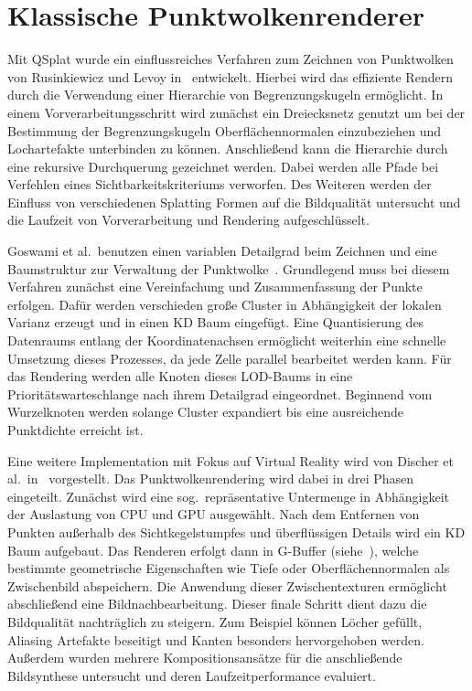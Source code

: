 \documentclass[hyperref, beleg, german, final, twoside]{cgvpub}
\begin{document}
\section{Klassische Punktwolkenrenderer}

Mit QSplat wurde ein einflussreiches Verfahren zum Zeichnen von Punktwolken von
Rusinkiewicz und Levoy in~\cite{rusinkiewicz2000qsplat} entwickelt. Hierbei
wird das effiziente Rendern durch die Verwendung einer Hierarchie von
Begrenzungskugeln ermöglicht. In einem Vorverarbeitungsschritt wird zunächst
ein Dreiecksnetz genutzt um bei der Bestimmung der Begrenzungskugeln
Oberflächennormalen einzubeziehen und Lochartefakte unterbinden zu können.
Anschließend kann die Hierarchie durch eine rekursive Durchquerung gezeichnet
werden. Dabei werden alle Pfade bei Verfehlen eines Sichtbarkeitskriteriums
verworfen. Des Weiteren werden der Einfluss von verschiedenen Splatting Formen
auf die Bildqualität untersucht und die Laufzeit von Vorverarbeitung und
Rendering aufgeschlüsselt.

Goswami et al.\ benutzen einen variablen Detailgrad beim Zeichnen und eine
Baumstruktur zur Verwaltung der Punktwolke~\cite{goswami2010high}. Grundlegend
muss bei diesem Verfahren zunächst eine Vereinfachung und Zusammenfassung der
Punkte erfolgen. Dafür werden verschieden große Cluster in Abhängigkeit der
lokalen Varianz erzeugt und in einen KD Baum eingefügt. Eine Quantisierung des
Datenraums entlang der Koordinatenachsen ermöglicht weiterhin eine schnelle
Umsetzung dieses Prozesses, da jede Zelle parallel bearbeitet werden kann. Für
das Rendering werden alle Knoten dieses LOD-Baums in eine
Prioritätswarteschlange nach ihrem Detailgrad eingeordnet. Beginnend vom
Wurzelknoten werden solange Cluster expandiert bis eine ausreichende
Punktdichte erreicht ist.

Eine weitere Implementation mit Fokus auf Virtual Reality wird von Discher et
al.\ in~\cite{discher2018point} vorgestellt. Das Punktwolkenrendering wird
dabei in drei Phasen eingeteilt. Zunächst wird eine sog.\ repräsentative
Untermenge in Abhängigkeit der Auslastung von CPU und GPU ausgewählt. Nach dem
Entfernen von Punkten außerhalb des Sichtkegelstumpfes und überflüssigen
Details wird ein KD Baum aufgebaut. Das Renderen erfolgt dann in G-Buffer
(siehe~\cite{saito1990comprehensible}), welche bestimmte geometrische
Eigenschaften wie Tiefe oder Oberflächennormalen als Zwischenbild abspeichern.
Die Anwendung dieser Zwischentexturen ermöglicht abschließend eine
Bildnachbearbeitung. Dieser finale Schritt dient dazu die Bildqualität
nachträglich zu steigern. Zum Beispiel können Löcher gefüllt, Aliasing
Artefakte beseitigt und Kanten besonders hervorgehoben werden. Außerdem wurden
mehrere Kompositionsansätze für die anschließende Bildsynthese untersucht und
deren Laufzeitperformance evaluiert.
\end{document}
